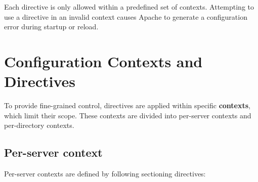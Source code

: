 \documentclass{scrbook}
\begin{document}
	Each directive is only allowed within a predefined set of contexts. Attempting to use a directive in an invalid context causes Apache to generate a configuration error during startup or reload.
	
	\section{Configuration Contexts and Directives}
	
	To provide fine-grained control, directives are applied within specific \textbf{contexts}, which limit their scope. These contexts are divided into per-server contexts and per-directory contexts.
	
	\subsection{Per-server context}
	Per-server contexts are defined by following sectioning directives:
	
\end{document}
